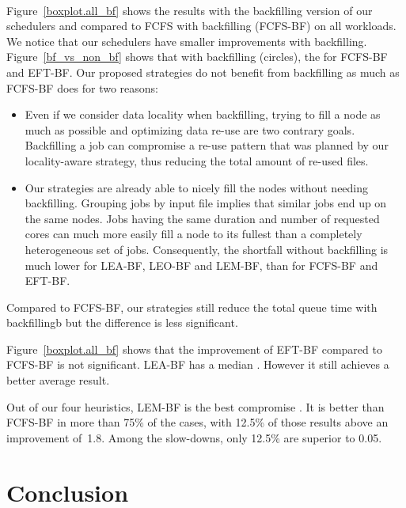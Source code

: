 \documentclass[sigconf,review,anonymous]{acmart}
\newcommand{\rev}[1]{{\color{blue}{#1}}}
\begin{document}
\paragraph{\rev{Results with backfilling}}
Figure~\ref{boxplot.all_bf} shows the results with the backfilling version of our
schedulers and compared to FCFS with backfilling (FCFS-BF) on all workloads.
We notice that our schedulers have smaller improvements with backfilling.
Figure~\ref{bf_vs_non_bf} shows that
with backfilling (circles),
the \rev{difference of performance with or without backfilling is much higher} for FCFS-BF and EFT-BF. 
Our proposed strategies do not benefit from backfilling as much as FCFS-BF does for two reasons:
\begin{itemize}
	\item Even if we consider data locality when backfilling, trying to fill a node as much as possible and optimizing data re-use are two contrary goals. 
	Backfilling a job can compromise a re-use pattern that was planned by our locality-aware strategy, thus reducing the total 
	amount of re-used files.
	\item Our strategies are already able to nicely fill the nodes without needing backfilling.
	Grouping jobs by input file implies that similar jobs end up on the same nodes.
	Jobs having the same duration and number of requested cores can much more easily fill a node to its fullest than a completely heterogeneous set of jobs.
	Consequently, the shortfall without backfilling is much lower for LEA-BF, LEO-BF and LEM-BF, than for FCFS-BF and EFT-BF.
\end{itemize}
Compared to FCFS-BF, our strategies still reduce the total queue time with backfillingb but the difference is less significant.

Figure~\ref{boxplot.all_bf} shows that the improvement of EFT-BF compared to FCFS-BF is not significant.
LEA-BF has a median \rev{on 1}. However it still achieves a better average result.

Out of our four heuristics, LEM-BF is the best compromise \rev{here}.
It is better than FCFS-BF in more than 75\% of the cases, 
with 12.5\% of those results above an improvement of~1.8.
Among the slow-downs, only 12.5\% are superior to 0.05.

\section{Conclusion}\label{sec.conclusion}
\end{document}

